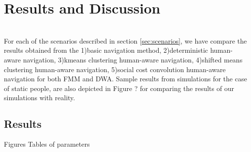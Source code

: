 \section{Results and Discussion}
\\

For each of the scenarios described in section \ref{sec:scenarios}, we have compare the results obtained from the 1)basic navigation method, 2)deterministic human-aware navigation, 3)kmeans clustering human-aware navigation, 4)shifted means clustering human-aware navigation, 5)social cost convolution human-aware navigation for both FMM and DWA. 
Sample results from simulations for the case of static people, are also depicted in Figure ? for comparing the results of our simulations with reality.






\subsection{Results}
\label{sec:results}

Figures
Tables of parameters



